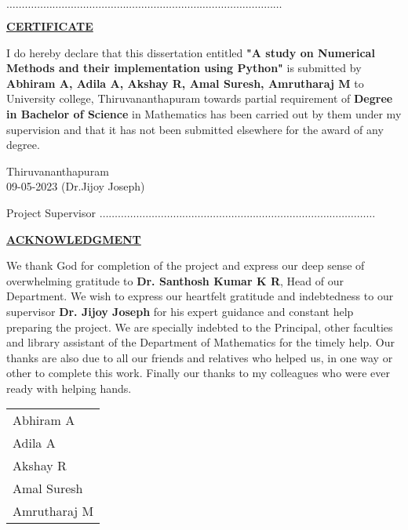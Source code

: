 \documentclass[12pt,a4paper,oneside]{book}
\begin{document}
	\noindent$\dots \dots \dots \dots \dots \dots \dots \dots \dots \dots \dots \dots\dots \dots \dots \dots \dots \dots\dots \dots \dots \dots \dots \dots\dots \dots \dots \dots \dots \dots$
	
	\vspace{5cm}
	\begin{center}
		\bfseries\Large\underline{CERTIFICATE}
	\end{center}
	\vspace{1cm}
	
	I do hereby declare that this dissertation entitled \textbf{"A study on Numerical Methods and their implementation using Python"} is submitted by \textbf{Abhiram A, Adila A, Akshay R, Amal Suresh, Amrutharaj M } to University college, Thiruvananthapuram towards partial requirement of \textbf{Degree in Bachelor of Science} in Mathematics has been carried out by them under my supervision and that it has not been submitted elsewhere for the award of any degree.\\[1.5cm]
	\begin{flushleft}
	Thiruvananthapuram\\09-05-2023
	\hfill
	(Dr.Jijoy Joseph)
 \end{flushleft}
\hfill
Project Supervisor  
\newpage 
\noindent$\dots \dots \dots \dots \dots \dots \dots \dots \dots \dots \dots \dots\dots \dots \dots \dots \dots \dots\dots \dots \dots \dots \dots \dots\dots \dots \dots \dots \dots \dots$

\vspace{4cm}
\begin{center}
	\bfseries\Large\underline{ACKNOWLEDGMENT}
\end{center}

\vspace{10pt}
\hspace{20pt} We thank God for completion of the project and express our deep sense of overwhelming gratitude to \textbf{Dr. Santhosh Kumar K R}, Head of our Department. We wish to express our heartfelt gratitude and indebtedness to our supervisor \textbf{Dr. Jijoy Joseph} for his expert guidance and constant help preparing the project. 
We are specially indebted to the Principal, other faculties and library assistant of the Department of Mathematics for the timely help. Our thanks are also due to all our friends and relatives who helped us, in one way or other to complete this work. Finally our thanks to my colleagues who were ever ready with helping hands.\\[0.5cm]
\begin{flushright}
	\begin{tabular}{l}Abhiram A\\ Adila A\\ Akshay R\\ Amal Suresh \\ Amrutharaj M
\end{tabular} \end{flushright}
\end{document}
